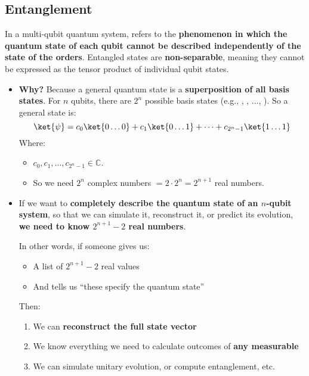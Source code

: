 \subsection{Entanglement}

In a multi-qubit quantum system,  refers to the \textbf{phenomenon in which the quantum state of each qubit cannot be described independently of the state of the orders}. Entangled states are \textbf{non-separable}, meaning they cannot be expressed as the tensor product of individual qubit states.

\highspace
\begin{itemize}
    \item {}

    \textcolor{Green3}{ \textbf{Why?}} Because a general quantum state is a \textbf{superposition of all basis states}. For $n$ qubits, there are $2^{n}$ possible basis states (e.g., , , $\dots$, ). So a general state is:
    \begin{equation*}
        \ket{\psi} = c_{0} \ket{0 \dots 0} + c_{1} \ket{0 \dots 1} + \dots + c_{2^{n} - 1} \ket{1 \dots 1}
    \end{equation*}
    Where:
    \begin{itemize}
        \item $c_{0}, c_{1}, \dots, c_{2^{n} - 1} \in \mathbb{C}$.
        \item So we need $2^{n}$ complex numbers $=2 \cdot 2^{n} = 2^{n+1}$ real numbers.
    \end{itemize}




    \item {}
    
    If we want to \textbf{completely describe the quantum state of an $n$-qubit system}, so that we can simulate it, reconstruct it, or predict its evolution, \textbf{we need to know $2^{n+1}-2$ real numbers}.

    \highspace
    In other words, if someone gives us:
    \begin{itemize}
        \item A list of $2^{n+1} - 2$ real values
        \item And tells us ``these specify the quantum state''
    \end{itemize}
    Then:
    \begin{enumerate}
        \item We can \textbf{reconstruct the full state vector}
        \item We know everything we need to calculate outcomes of \textbf{any measurable}
        \item We can simulate unitary evolution, or compute entanglement, etc.
    \end{enumerate}


\end{itemize}
